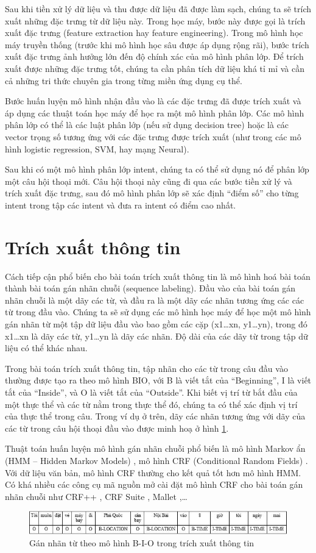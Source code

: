 Sau khi tiền xử lý dữ liệu và thu được dữ liệu đã được làm sạch, chúng ta sẽ trích xuất những đặc trưng từ dữ liệu này. Trong học máy, bước này được gọi là trích xuất đặc trưng (feature extraction hay feature engineering). Trong mô hình học máy truyền thống (trước khi mô hình học sâu được áp dụng rộng rãi), bước trích xuất đặc trưng ảnh hưởng lớn đến độ chính xác của mô hình phân lớp. Để trích xuất được những đặc trưng tốt, chúng ta cần phân tích dữ liệu khá tỉ mỉ và cần cả những tri thức chuyên gia trong từng miền ứng dụng cụ thể.

Bước huấn luyện mô hình nhận đầu vào là các đặc trưng đã được trích xuất và áp dụng các thuật toán học máy để học ra một mô hình phân lớp. Các mô hình phân lớp có thể là các luật phân lớp (nếu sử dụng decision tree) hoặc là các vector trọng số tương ứng với các đặc trưng được trích xuất (như trong các mô hình logistic regression, SVM, hay mạng Neural).

Sau khi có một mô hình phân lớp intent, chúng ta có thể sử dụng nó để phân lớp một câu hội thoại mới. Câu hội thoại này cũng đi qua các bước tiền xử lý và trích xuất đặc trưng, sau đó mô hình phân lớp sẽ xác định “điểm số” cho từng intent trong tập các intent và đưa ra intent có điểm cao nhất.

\section{Trích xuất thông tin}

Cách tiếp cận phổ biến cho bài toán trích xuất thông tin là mô hình hoá bài toán thành bài toán gán nhãn chuỗi (sequence labeling). Đầu vào của bài toán gán nhãn chuỗi là một dãy các từ, và đầu ra là một dãy các nhãn tương ứng các các từ trong đầu vào. Chúng ta sẽ sử dụng các mô hình học máy để học một mô hình gán nhãn từ một tập dữ liệu đầu vào bao gồm các cặp (x1…xn, y1…yn), trong đó x1…xn là dãy các từ, y1…yn là dãy các nhãn. Độ dài của các dãy từ trong tập dữ liệu có thể khác nhau.

Trong bài toán trích xuất thông tin, tập nhãn cho các từ trong câu đầu vào thường được tạo ra theo  mô hình BIO, với B là viết tắt của “Beginning”, I là viết tắt của “Inside”, và O là viết tắt của “Outside”. Khi biết vị trí từ bắt đầu của một thực thể và các từ nằm trong thực thể đó, chúng ta có thể xác định vị trí của thực thể trong câu. Trong ví dụ ở trên, dãy các nhãn tương ứng với dãy của các từ trong câu hội thoại đầu vào được minh hoạ ở hình \ref{fig:model-BIO}.

Thuật toán huấn luyện mô hình gán nhãn chuỗi phổ biến là mô hình Markov ẩn (HMM – Hidden Markov Models) \cite{2}, mô hình CRF (Conditional Random Fields) \cite{3}. Với dữ liệu văn bản, mô hình CRF thường cho kết quả tốt hơn mô hình HMM. Có khá nhiều các công cụ mã nguồn mở cài đặt mô hình CRF cho bài toán gán nhãn chuỗi như CRF++ \cite{4}, CRF Suite \cite{5}, Mallet \cite{6},…

\begin{figure}[htp]
    \centering
    \includegraphics[width=15cm]{images/Model-BIO.png}
    \caption{Gán nhãn từ theo mô hình B-I-O trong trích xuất thông tin}
    \label{fig:model-BIO}
\end{figure}

